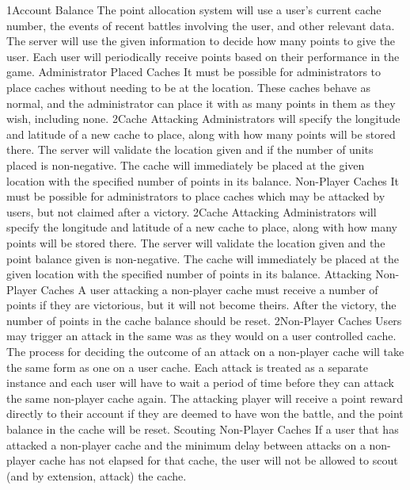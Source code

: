 			{1}{Account Balance}
			{The point allocation system will use a user's current cache 
			number, the events of recent battles involving the user, and other 
			relevant data.}
			{The server will use the given information to decide how many
			points to give the user.}
			{Each user will periodically receive points based on their 
			performance in the game.}
		\funcreq %
			{Administrator Placed Caches}
			{It must be possible for administrators to place caches without 
			needing to be at the location. These caches behave as normal, and
			the administrator can place it with as many points in them as they
			wish, including none.}
			{2}{Cache Attacking}
			{Administrators will specify the longitude and latitude of a new 
			cache to place, along with how many points will be stored there.}
			{The server will validate the location given and if the number of 
			units placed is non-negative.}
			{The cache will immediately be placed at the given location with 
			the specified number of points in its balance.}
		\funcreq %
			{Non-Player Caches}
			{It must be possible for administrators to place caches which may 
			be attacked by users, but not claimed after a victory.}
			{2}{Cache Attacking}
			{Administrators will specify the longitude and latitude of a new 
			cache to place, along with how many points will be stored there.}
			{The server will validate the location given and the point balance 
			given is non-negative.}
			{The cache will immediately be placed at the given location with 
			the specified number of points in its balance.}
		\funcreq %
			{Attacking Non-Player Caches}
			{A user attacking a non-player cache must receive a number of 
			points if they are victorious, but it will not become theirs. 
			After the victory, the number of points in the cache balance should 
			be reset.}
			{2}{Non-Player Caches}
			{Users may trigger an attack in the same was as they would on a 
			user controlled cache.}
			{The process for deciding the outcome of an attack on a non-player 
			cache will take the same form as one on a user cache. Each attack 
			is treated as a separate instance and each user will have to wait a
			period of time before they can attack the same non-player cache 
			again.}
			{The attacking player will receive a point reward directly to 
			their account if they are deemed to have won the battle, and the 
			point balance in the cache will be reset.}
		\funcreq %
			{Scouting Non-Player Caches}
			{If a user that has attacked a non-player cache and the minimum
			delay between attacks on a non-player cache has not elapsed for
			that cache, the	user will not be allowed to scout (and by
			extension, attack) the cache.}
